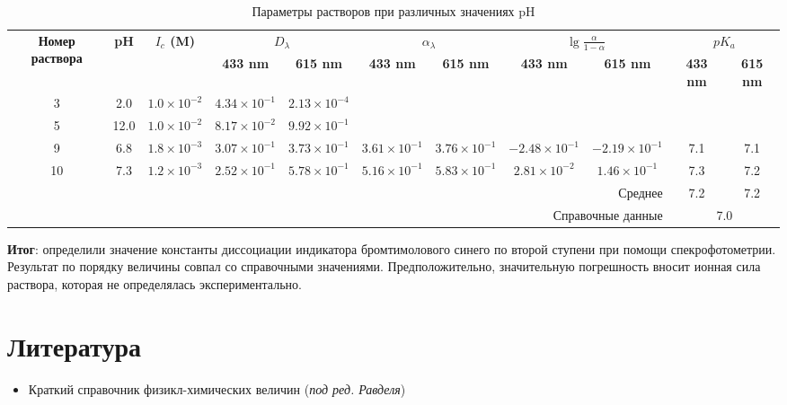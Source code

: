 \documentclass{article}
\begin{document}
	
\begin{table}[htbp]
	\centering
	\caption{Параметры растворов при различных значениях pH}
	\begin{adjustbox}{width=\textwidth}
		\begin{tabular}{ccccccccccc}  %
			\toprule
			\multirow{2}{*}{\textbf{Номер раствора}} & \multirow{2}{*}{\textbf{pH}} & \multirow{2}{*}{\textbf{$I_c$ (M)}} & \multicolumn{2}{c}{\textbf{$D_{\lambda}$}} & \multicolumn{2}{c}{\textbf{$\alpha_{\lambda}$}} & \multicolumn{2}{c}{\textbf{$\lg{\frac{\alpha}{1-\alpha}}$}} & \multicolumn{2}{c}{\textbf{$pK_a$}} \\  
			\cmidrule(lr){4-5} \cmidrule(lr){6-7} \cmidrule(lr){8-9} \cmidrule(lr){10-11}
			&  &  & \textbf{433 \unit{\nano\meter}} & \textbf{615 \unit{\nano\meter}} & \textbf{433 \unit{\nano\meter}} & \textbf{615 \unit{\nano\meter}} & \textbf{433 \unit{\nano\meter}} & \textbf{615 \unit{\nano\meter}} & \textbf{433 \unit{\nano\meter}} & \textbf{615 \unit{\nano\meter}} \\  
			\midrule
			3  & 2.0  & $1.0 \times 10^{-2}$  & $4.34 \times 10^{-1}$ & $2.13 \times 10^{-4}$ & & &  \\ 
			5  & 12.0 & $1.0 \times 10^{-2}$  & $8.17 \times 10^{-2}$ & $9.92 \times 10^{-1}$ & & & & & &  \\ 
			9  & 6.8  & $1.8 \times 10^{-3}$  & $3.07 \times 10^{-1}$ & $3.73 \times 10^{-1}$ & $3.61 \times 10^{-1}$ & $3.76 \times 10^{-1}$ & $-2.48 \times 10^{-1}$ & $-2.19 \times 10^{-1}$ & 7.1 & 7.1 \\  
			10 & 7.3  & $1.2 \times 10^{-3}$  & $2.52 \times 10^{-1}$ & $5.78 \times 10^{-1}$ & $5.16 \times 10^{-1}$ & $5.83 \times 10^{-1}$ & $2.81 \times 10^{-2}$ & $1.46 \times 10^{-1}$ & 7.3 & 7.2 \\  
			\midrule
			\multicolumn{9}{r}{Среднее}  &  7.2 & 7.2 \\  %
			\multicolumn{9}{r}{Справочные данные}  & \multicolumn{2}{c}{7.0}\\  %
			\bottomrule
		\end{tabular}
		\label{tab:pka}
	\end{adjustbox}
\end{table}
\textbf{Итог}: определили значение константы диссоциации индикатора бромтимолового синего по второй ступени при помощи спекрофотометрии. Результат по порядку величины совпал со справочными значениями. Предположительно, значительную погрешность вносит ионная сила раствора, которая не определялась экспериментально.

\pagebreak
\section{Литература}
\begin{itemize}
	\item Краткий справочник физикл-химических величин (\textit{под ред. Равделя})
\end{itemize}
\end{document}
